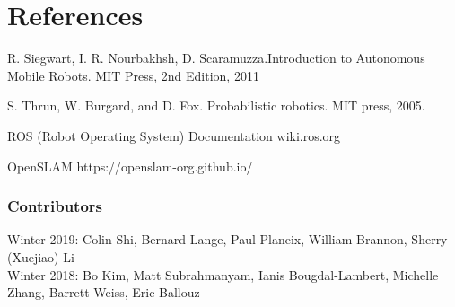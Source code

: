 \documentclass[twoside]{article}
\begin{document}
\section {References}
\begin{enumerate}[label={[\arabic*]}]
\item R. Siegwart, I. R. Nourbakhsh, D. Scaramuzza.Introduction to Autonomous Mobile Robots. MIT Press, 2nd Edition, 2011
\item S. Thrun, W. Burgard, and D. Fox. Probabilistic robotics. MIT press, 2005.
\item ROS (Robot Operating System) Documentation wiki.ros.org
\item OpenSLAM https://openslam-org.github.io/


\subsubsection*{Contributors}
Winter 2019: Colin Shi, Bernard Lange, Paul Planeix, William Brannon, Sherry (Xuejiao) Li
\\
Winter 2018: Bo Kim, Matt Subrahmanyam, Ianis Bougdal-Lambert, Michelle Zhang, Barrett Weiss, Eric Ballouz


\end{enumerate}
\end{document}
